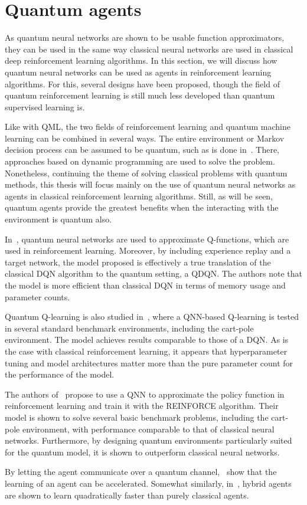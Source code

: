 \section{Quantum agents}
\label{sec:quantum_agents}

As quantum neural networks are shown to be usable function approximators, they can be used in the same way classical neural networks are used in classical deep reinforcement learning algorithms.
In this section, we will discuss how quantum neural networks can be used as agents in reinforcement learning algorithms.
For this, several designs have been proposed, though the field of quantum reinforcement learning is still much less developed than quantum supervised learning is.

Like with QML, the two fields of reinforcement learning and quantum machine learning can be combined in several ways.
The entire environment or Markov decision process can be assumed to be quantum, such as is done in~\autocite{ying2021}.
There, approaches based on dynamic programming are used to solve the problem.
Nonetheless, continuing the theme of solving classical problems with quantum methods, this thesis will focus mainly on the use of quantum neural networks as agents in classical reinforcement learning algorithms.
Still, as will be seen, quantum agents provide the greatest benefits when the interacting with the environment is quantum also.

In~\autocite{chen2020}, quantum neural networks are used to approximate Q-functions, which are used in reinforcement learning.
Moreover, by including experience replay and a target network, the model proposed is effectively a true translation of the classical DQN algorithm to the quantum setting, a QDQN.
The authors note that the model is more efficient than classical DQN in terms of memory usage and parameter counts.

Quantum Q-learning is also studied in~\autocite{skolik2022}, where a QNN-based Q-learning is tested in several standard benchmark environments, including the cart-pole environment.
The model achieves results comparable to those of a DQN.
As is the case with classical reinforcement learning, it appears that hyperparameter tuning and model architectures matter more than the pure parameter count for the performance of the model.

The authors of~\autocite{jerbi2021} propose to use a QNN to approximate the policy function in reinforcement learning and train it with the REINFORCE algorithm.
Their model is shown to solve several basic benchmark problems, including the cart-pole environment, with performance comparable to that of classical neural networks.
Furthermore, by designing quantum environments particularly suited for the quantum model, it is shown to outperform classical neural networks.

By letting the agent communicate over a quantum channel,~\autocite{saggio2021} show that the learning of an agent can be accelerated.
Somewhat similarly, in~\autocite{hamann2022}, hybrid agents are shown to learn quadratically faster than purely classical agents.